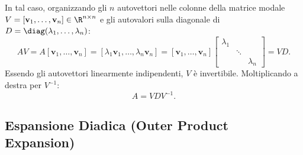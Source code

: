 In tal caso, organizzando gli $n$ autovettori nelle colonne della matrice modale $V = [\mathbf{v}_1, \dots, \mathbf{v}_n] \in \R^{n \times n}$ e gli autovalori sulla diagonale di $D = \diag(\lambda_1, \dots, \lambda_n)$:
\begin{equation}
    A V = A [\mathbf{v}_1, \dots, \mathbf{v}_n] = [\lambda_1 \mathbf{v}_1, \dots, \lambda_n \mathbf{v}_n] = [\mathbf{v}_1, \dots, \mathbf{v}_n] \begin{bmatrix} \lambda_1 & & \\ & \ddots & \\ & & \lambda_n \end{bmatrix} = V D.
\end{equation}
Essendo gli autovettori linearmente indipendenti, $V$ \`e invertibile. Moltiplicando a destra per $V^{-1}$:
\begin{equation}
    A = V D V^{-1}.
\end{equation}

\subsection{Espansione Diadica (Outer Product Expansion)}

